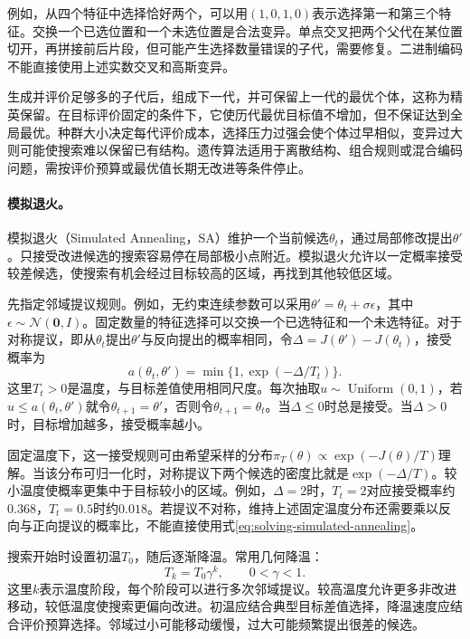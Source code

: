 例如，从四个特征中选择恰好两个，可以用$(1,0,1,0)$表示选择第一和第三个特征。交换一个已选位置和一个未选位置是合法变异。单点交叉把两个父代在某位置切开，再拼接前后片段，但可能产生选择数量错误的子代，需要修复。二进制编码不能直接使用上述实数交叉和高斯变异。

生成并评价足够多的子代后，组成下一代，并可保留上一代的最优个体，这称为精英保留。在目标评价固定的条件下，它使历代最优目标值不增加，但不保证达到全局最优。种群大小决定每代评价成本，选择压力过强会使个体过早相似，变异过大则可能使搜索难以保留已有结构。遗传算法适用于离散结构、组合规则或混合编码问题，需按评价预算或最优值长期无改进等条件停止。

\paragraph{模拟退火。}
模拟退火（Simulated Annealing，SA）维护一个当前候选$\theta_t$，通过局部修改提出$\theta'$。只接受改进候选的搜索容易停在局部极小点附近。模拟退火允许以一定概率接受较差候选，使搜索有机会经过目标较高的区域，再找到其他较低区域。

先指定邻域提议规则。例如，无约束连续参数可以采用$\theta'=\theta_t+\sigma\epsilon$，其中$\epsilon\sim\mathcal N(\bm0,I)$。固定数量的特征选择可以交换一个已选特征和一个未选特征。对于对称提议，即从$\theta_t$提出$\theta'$与反向提出的概率相同，令$\Delta=J(\theta')-J(\theta_t)$，接受概率为
\begin{equation}
 a(\theta_t,\theta')=\min\{1,\exp(-\Delta/T_t)\}.
 \label{eq:solving-simulated-annealing}
\end{equation}
这里$T_t>0$是温度，与目标差值使用相同尺度。每次抽取$u\sim\operatorname{Uniform}(0,1)$，若$u\leq a(\theta_t,\theta')$就令$\theta_{t+1}=\theta'$，否则令$\theta_{t+1}=\theta_t$。当$\Delta\leq0$时总是接受。当$\Delta>0$时，目标增加越多，接受概率越小。

固定温度下，这一接受规则可由希望采样的分布$\pi_T(\theta)\propto\exp(-J(\theta)/T)$理解。当该分布可归一化时，对称提议下两个候选的密度比就是$\exp(-\Delta/T)$。较小温度使概率更集中于目标较小的区域。例如，$\Delta=2$时，$T_t=2$对应接受概率约$0.368$，$T_t=0.5$时约$0.018$。若提议不对称，维持上述固定温度分布还需要乘以反向与正向提议的概率比，不能直接使用式\eqref{eq:solving-simulated-annealing}。

搜索开始时设置初温$T_0$，随后逐渐降温。常用几何降温：
\begin{equation}
 T_k=T_0\gamma^k,\qquad 0<\gamma<1.
\end{equation}
这里$k$表示温度阶段，每个阶段可以进行多次邻域提议。较高温度允许更多非改进移动，较低温度使搜索更偏向改进。初温应结合典型目标差值选择，降温速度应结合评价预算选择。邻域过小可能移动缓慢，过大可能频繁提出很差的候选。


